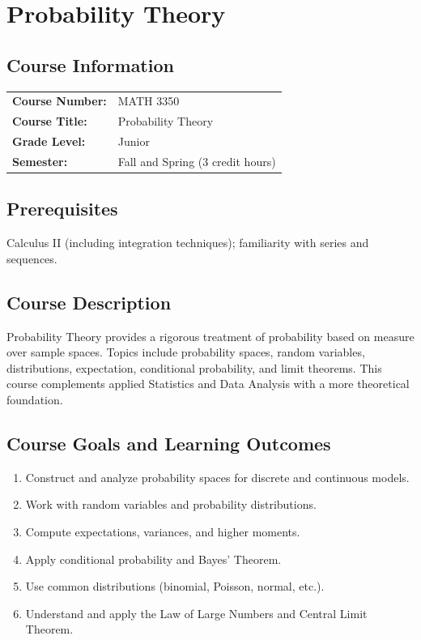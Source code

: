 \documentclass[12pt,oneside]{book}
\begin{document}
\chapter{Probability Theory}

\section{Course Information}

\begin{tabular}{ll}
\textbf{Course Number:} & MATH 3350 \\
\textbf{Course Title:} & Probability Theory \\
\textbf{Grade Level:} & Junior \\
\textbf{Semester:} & Fall and Spring (3 credit hours) \\
\end{tabular}

\section{Prerequisites}

Calculus II (including integration techniques); familiarity with series and sequences.

\section{Course Description}

Probability Theory provides a rigorous treatment of probability based on measure over sample spaces. Topics include probability spaces, random variables, distributions, expectation, conditional probability, and limit theorems. This course complements applied Statistics and Data Analysis with a more theoretical foundation.

\section{Course Goals and Learning Outcomes}

\begin{enumerate}
    \item Construct and analyze probability spaces for discrete and continuous models.
    \item Work with random variables and probability distributions.
    \item Compute expectations, variances, and higher moments.
    \item Apply conditional probability and Bayes’ Theorem.
    \item Use common distributions (binomial, Poisson, normal, etc.).
    \item Understand and apply the Law of Large Numbers and Central Limit Theorem.
\end{enumerate}
\end{document}

